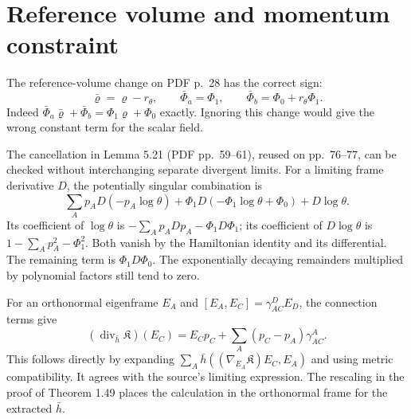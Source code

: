 \documentclass[10pt]{article}
\begin{document}
\section*{Reference volume and momentum constraint}
The reference-volume change on PDF p. 28 has the correct sign: \[\bar\varrho=\varrho-r_\theta,\qquad
 \bar\Phi_a=\Phi_1,\qquad
 \bar\Phi_b=\Phi_0+r_\theta\Phi_1.\] Indeed \(\bar\Phi_a\bar\varrho+\bar\Phi_b
=\Phi_1\varrho+\Phi_0\) exactly. Ignoring this change would give the wrong constant term for the scalar field.\par
The cancellation in Lemma 5.21 (PDF pp. 59–61), reused on pp. 76–77, can be checked without interchanging separate divergent limits. For a limiting frame derivative \(D\), the potentially singular combination is \[\sum_A p_A D(-p_A\log\theta)
 +\Phi_1D(-\Phi_1\log\theta+\Phi_0)+D\log\theta .\] Its coefficient of \(\log\theta\) is \(-\sum_Ap_A Dp_A-\Phi_1D\Phi_1\); its coefficient of \(D\log\theta\) is \(1-\sum_Ap_A^2-\Phi_1^2\). Both vanish by the Hamiltonian identity and its differential. The remaining term is \(\Phi_1D\Phi_0\). The exponentially decaying remainders multiplied by polynomial factors still tend to zero.\par
For an orthonormal eigenframe \(E_A\) and \([E_A,E_C]=\gamma^D_{AC}E_D\), the connection terms give \[(\operatorname{div}_{\bar h}\mathfrak K)(E_C)
 =E_Cp_C+\sum_A(p_C-p_A)\gamma^A_{AC}.\] This follows directly by expanding \(\sum_A\bar h((\nabla_{E_A}\mathfrak K)E_C,E_A)\) and using metric compatibility. It agrees with the source’s limiting expression. The rescaling in the proof of Theorem 1.49 places the calculation in the orthonormal frame for the extracted \(\bar h\).\par
\end{document}
